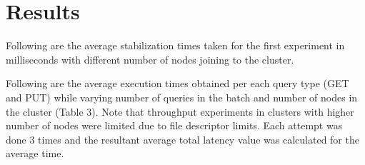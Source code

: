 \documentclass[
    a4paper,
    twocolumn,
]{article}
\begin{document}
\begin{table}[!ht]
	\renewcommand{\arraystretch}{1.1}
	\centering
	\caption{Nodes used in each experiment}
\end{table}

\section{Results}

Following are the average stabilization times taken for the first experiment in milliseconds with different number of nodes joining to the cluster. 

Following are the average execution times obtained per each query type (GET and PUT) while varying number of queries in the batch and number of nodes in the cluster (Table 3). Note that throughput experiments in clusters with higher number of nodes were limited due to file descriptor limits. Each attempt was done 3 times and the resultant average total latency value was calculated for the average time.
\end{document}
